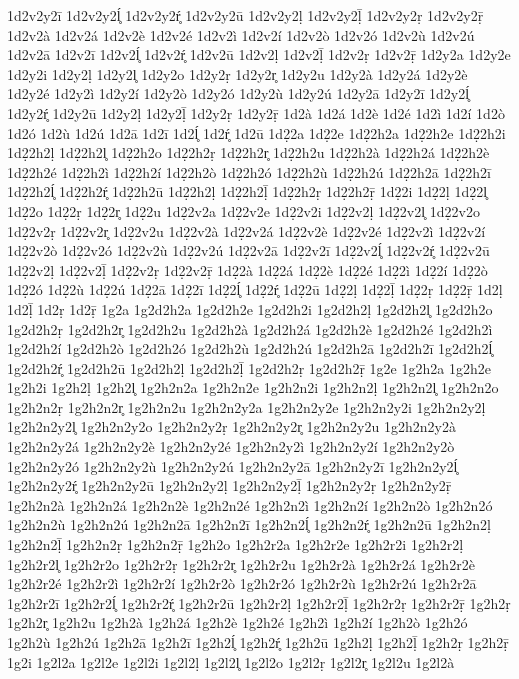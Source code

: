 {1d2v2y2ī
1d2v2y2ĺ̥
1d2v2y2ŕ̥
1d2v2y2ū
1d2v2y2ḷ
1d2v2y2ḹ
1d2v2y2ṛ
1d2v2y2ṝ
1d2v2à
1d2v2á
1d2v2è
1d2v2é
1d2v2ì
1d2v2í
1d2v2ò
1d2v2ó
1d2v2ù
1d2v2ú
1d2v2ā
1d2v2ī
1d2v2ĺ̥
1d2v2ŕ̥
1d2v2ū
1d2v2ḷ
1d2v2ḹ
1d2v2ṛ
1d2v2ṝ
1d2y2a
1d2y2e
1d2y2i
1d2y2ḷ
1d2y2l̥
1d2y2o
1d2y2ṛ
1d2y2r̥
1d2y2u
1d2y2à
1d2y2á
1d2y2è
1d2y2é
1d2y2ì
1d2y2í
1d2y2ò
1d2y2ó
1d2y2ù
1d2y2ú
1d2y2ā
1d2y2ī
1d2y2ĺ̥
1d2y2ŕ̥
1d2y2ū
1d2y2ḷ
1d2y2ḹ
1d2y2ṛ
1d2y2ṝ
1d2à
1d2á
1d2è
1d2é
1d2ì
1d2í
1d2ò
1d2ó
1d2ù
1d2ú
1d2ā
1d2ī
1d2ĺ̥
1d2ŕ̥
1d2ū
1d2̣2a
1d2̣2e
1d2̣2h2a
1d2̣2h2e
1d2̣2h2i
1d2̣2h2ḷ
1d2̣2h2l̥
1d2̣2h2o
1d2̣2h2ṛ
1d2̣2h2r̥
1d2̣2h2u
1d2̣2h2à
1d2̣2h2á
1d2̣2h2è
1d2̣2h2é
1d2̣2h2ì
1d2̣2h2í
1d2̣2h2ò
1d2̣2h2ó
1d2̣2h2ù
1d2̣2h2ú
1d2̣2h2ā
1d2̣2h2ī
1d2̣2h2ĺ̥
1d2̣2h2ŕ̥
1d2̣2h2ū
1d2̣2h2ḷ
1d2̣2h2ḹ
1d2̣2h2ṛ
1d2̣2h2ṝ
1d2̣2i
1d2̣2ḷ
1d2̣2l̥
1d2̣2o
1d2̣2ṛ
1d2̣2r̥
1d2̣2u
1d2̣2v2a
1d2̣2v2e
1d2̣2v2i
1d2̣2v2ḷ
1d2̣2v2l̥
1d2̣2v2o
1d2̣2v2ṛ
1d2̣2v2r̥
1d2̣2v2u
1d2̣2v2à
1d2̣2v2á
1d2̣2v2è
1d2̣2v2é
1d2̣2v2ì
1d2̣2v2í
1d2̣2v2ò
1d2̣2v2ó
1d2̣2v2ù
1d2̣2v2ú
1d2̣2v2ā
1d2̣2v2ī
1d2̣2v2ĺ̥
1d2̣2v2ŕ̥
1d2̣2v2ū
1d2̣2v2ḷ
1d2̣2v2ḹ
1d2̣2v2ṛ
1d2̣2v2ṝ
1d2̣2à
1d2̣2á
1d2̣2è
1d2̣2é
1d2̣2ì
1d2̣2í
1d2̣2ò
1d2̣2ó
1d2̣2ù
1d2̣2ú
1d2̣2ā
1d2̣2ī
1d2̣2ĺ̥
1d2̣2ŕ̥
1d2̣2ū
1d2̣2ḷ
1d2̣2ḹ
1d2̣2ṛ
1d2̣2ṝ
1d2ḷ
1d2ḹ
1d2ṛ
1d2ṝ
1g2a
1g2d2h2a
1g2d2h2e
1g2d2h2i
1g2d2h2ḷ
1g2d2h2l̥
1g2d2h2o
1g2d2h2ṛ
1g2d2h2r̥
1g2d2h2u
1g2d2h2à
1g2d2h2á
1g2d2h2è
1g2d2h2é
1g2d2h2ì
1g2d2h2í
1g2d2h2ò
1g2d2h2ó
1g2d2h2ù
1g2d2h2ú
1g2d2h2ā
1g2d2h2ī
1g2d2h2ĺ̥
1g2d2h2ŕ̥
1g2d2h2ū
1g2d2h2ḷ
1g2d2h2ḹ
1g2d2h2ṛ
1g2d2h2ṝ
1g2e
1g2h2a
1g2h2e
1g2h2i
1g2h2ḷ
1g2h2l̥
1g2h2n2a
1g2h2n2e
1g2h2n2i
1g2h2n2ḷ
1g2h2n2l̥
1g2h2n2o
1g2h2n2ṛ
1g2h2n2r̥
1g2h2n2u
1g2h2n2y2a
1g2h2n2y2e
1g2h2n2y2i
1g2h2n2y2ḷ
1g2h2n2y2l̥
1g2h2n2y2o
1g2h2n2y2ṛ
1g2h2n2y2r̥
1g2h2n2y2u
1g2h2n2y2à
1g2h2n2y2á
1g2h2n2y2è
1g2h2n2y2é
1g2h2n2y2ì
1g2h2n2y2í
1g2h2n2y2ò
1g2h2n2y2ó
1g2h2n2y2ù
1g2h2n2y2ú
1g2h2n2y2ā
1g2h2n2y2ī
1g2h2n2y2ĺ̥
1g2h2n2y2ŕ̥
1g2h2n2y2ū
1g2h2n2y2ḷ
1g2h2n2y2ḹ
1g2h2n2y2ṛ
1g2h2n2y2ṝ
1g2h2n2à
1g2h2n2á
1g2h2n2è
1g2h2n2é
1g2h2n2ì
1g2h2n2í
1g2h2n2ò
1g2h2n2ó
1g2h2n2ù
1g2h2n2ú
1g2h2n2ā
1g2h2n2ī
1g2h2n2ĺ̥
1g2h2n2ŕ̥
1g2h2n2ū
1g2h2n2ḷ
1g2h2n2ḹ
1g2h2n2ṛ
1g2h2n2ṝ
1g2h2o
1g2h2r2a
1g2h2r2e
1g2h2r2i
1g2h2r2ḷ
1g2h2r2l̥
1g2h2r2o
1g2h2r2ṛ
1g2h2r2r̥
1g2h2r2u
1g2h2r2à
1g2h2r2á
1g2h2r2è
1g2h2r2é
1g2h2r2ì
1g2h2r2í
1g2h2r2ò
1g2h2r2ó
1g2h2r2ù
1g2h2r2ú
1g2h2r2ā
1g2h2r2ī
1g2h2r2ĺ̥
1g2h2r2ŕ̥
1g2h2r2ū
1g2h2r2ḷ
1g2h2r2ḹ
1g2h2r2ṛ
1g2h2r2ṝ
1g2h2ṛ
1g2h2r̥
1g2h2u
1g2h2à
1g2h2á
1g2h2è
1g2h2é
1g2h2ì
1g2h2í
1g2h2ò
1g2h2ó
1g2h2ù
1g2h2ú
1g2h2ā
1g2h2ī
1g2h2ĺ̥
1g2h2ŕ̥
1g2h2ū
1g2h2ḷ
1g2h2ḹ
1g2h2ṛ
1g2h2ṝ
1g2i
1g2l2a
1g2l2e
1g2l2i
1g2l2ḷ
1g2l2l̥
1g2l2o
1g2l2ṛ
1g2l2r̥
1g2l2u
1g2l2à
}
